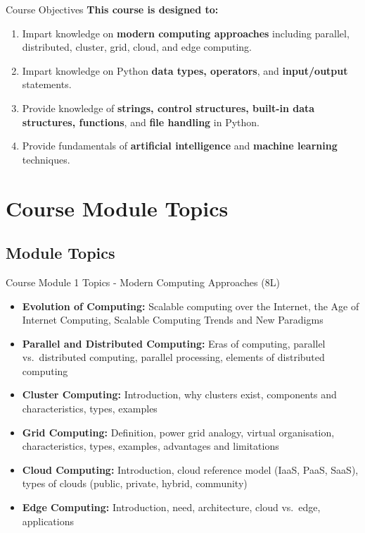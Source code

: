 \documentclass[aspectratio=169]{beamer}
\begin{document}
\begin{frame}{Course Objectives}
\textbf{This course is designed to:}
\vspace{0.3cm}
\begin{enumerate}
\item<1-> Impart knowledge on \textbf{modern computing approaches} including parallel, distributed, cluster, grid, cloud, and edge computing.
\item<2-> Impart knowledge on Python \textbf{data types, operators}, and \textbf{input/output} statements.
\item<3-> Provide knowledge of \textbf{strings, control structures, built-in data structures, functions}, and \textbf{file handling} in Python.
\item<4-> Provide fundamentals of \textbf{artificial intelligence} and \textbf{machine learning} techniques.
\end{enumerate}
\end{frame}

\section{Course Module Topics}
\subsection{Module Topics}

\begin{frame}{Course Module 1 Topics - Modern Computing Approaches (8L)}
\begin{itemize}
\item \textbf{Evolution of Computing:} Scalable computing over the Internet, the Age of Internet Computing, Scalable Computing Trends and New Paradigms
\item \textbf{Parallel and Distributed Computing:} Eras of computing, parallel vs.\ distributed computing, parallel processing, elements of distributed computing
\item \textbf{Cluster Computing:} Introduction, why clusters exist, components and characteristics, types, examples
\item \textbf{Grid Computing:} Definition, power grid analogy, virtual organisation, characteristics, types, examples, advantages and limitations
\item \textbf{Cloud Computing:} Introduction, cloud reference model (IaaS, PaaS, SaaS), types of clouds (public, private, hybrid, community)
\item \textbf{Edge Computing:} Introduction, need, architecture, cloud vs.\ edge, applications
\end{itemize}
\end{frame}
\end{document}

